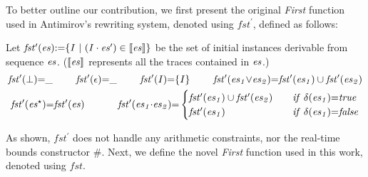 \documentclass[acmsmall,10pt,review]{acmart}
\newcommand{\es}{\textcolor{black}{\ensuremath{{es}}}}
\newcommand{\seq}{\cdot}
\newcommand{\code}[1]{{\tt{\ensuremath{\m{#1}}}}}
\newcommand{\esn}[2]{\ensuremath{#1^{#2}}}
\newcommand{\empt}{\textcolor{black}{\ensuremath{\epsilon}}}
\newcommand{\bott}{\textcolor{black}{\ensuremath{\bot}}}
\newcommand{\m}{\mathit}
\begin{document}
{To better outline our contribution, we first present the original \emph{First} function used in  Antimirov's rewriting system, denoted using \code{fst^\prime}, defined as follows:

\begin{definition}\label{First1}
Let \code{fst^\prime(\es){:=}\{ I\ |\  (I \cdot \es^\prime) \in \llbracket  \es \rrbracket  \}} be the set of initial instances derivable from  sequence \code{\es}. (\code{\llbracket  \es \rrbracket } represents all the traces contained in \code{\es}.)
{ 
 \begin{gather*} 
\code{fst^\prime( \bott) {=} \_ } \qquad\ 
\code{ fst^\prime(\empt) {=} \_} \qquad\ 
\code{fst^\prime( I) {=} \{ I \} }
 \qquad\ 
\code{fst^\prime(  \es_1 {\vee} \es_2) {=} fst^\prime(  \es_1) \cup fst^\prime(  \es_2)}
\\
{
\code{fst^\prime( \esn{\es}{\star} ) {=} fst^\prime({ \es})} 
\qquad\quad\
\code{fst^\prime(\es_1 {\seq} \es_2) {=} } 
\begin{cases}
      \code{\code{fst^\prime(  \es_1)} \cup \code{fst^\prime(  \es_2)} } \quad & \code{ if\ \delta(\es_1) {=} true}\\
      \code{\code{fst^\prime(  \es_1)}} & \code{  if\ \delta(\es_1) {=} false}
    \end{cases} 
    }
\end{gather*}
}
\end{definition}

As shown, \code{fst^\prime} does not handle 
any arithmetic constraints, nor 
the real-time bounds constructor \code{\#}. Next, we define the novel  \emph{First} function used in this work, denoted using \code{fst}. 

}
\end{document}
